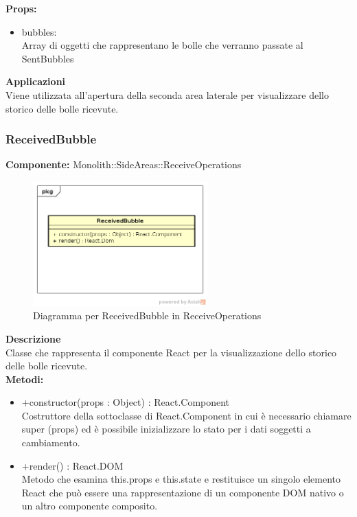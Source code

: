 \textbf{Props:} 
\begin{itemize}
\item bubbles: 
\\
Array di oggetti che rappresentano le bolle che verranno passate al SentBubbles

\end{itemize} 


\textbf{Applicazioni}\\
Viene utilizzata all'apertura della seconda area laterale per visualizzare dello storico delle bolle ricevute. 


\clearpage

\subsubsection{ReceivedBubble}
\textbf{Componente:}  Monolith::SideAreas::ReceiveOperations\\
   \FloatBarrier
   \begin{figure}[ht]
   \centering
   \includegraphics[width=0.6\textwidth]{img/single-ReceivedBubble.png}
   \caption{{Diagramma per ReceivedBubble in ReceiveOperations}}
\end{figure}
\FloatBarrier
\textbf{Descrizione}\\
Classe che rappresenta il componente React per la visualizzazione dello storico delle bolle ricevute. \\
\textbf{Metodi:} 
\begin{itemize}
\item +constructor(props : Object) : React.Component 
\\
Costruttore della sottoclasse di React.Component in cui è necessario chiamare super (props) ed è possibile inizializzare lo stato per i dati soggetti a cambiamento.
\item +render() : React.DOM 
\\
Metodo che esamina this.props e this.state e restituisce un singolo elemento React che può essere una rappresentazione di un componente DOM nativo o un altro componente composito.
\end{itemize}


